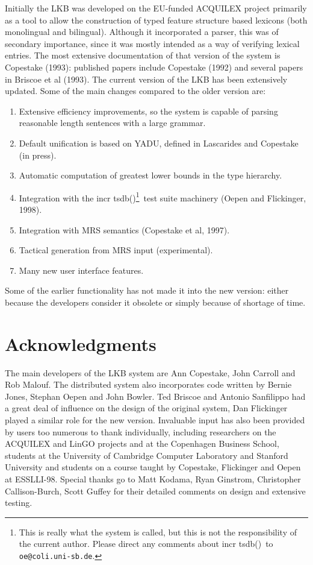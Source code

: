 \documentclass[12pt]{report}
\newcommand{\itsdb}{{\sf \lbrack incr tsdb()\rbrack}}
\begin{document}
Initially the LKB was developed on the 
EU-funded ACQUILEX project primarily as a
tool to allow the construction of typed feature structure based lexicons
(both monolingual and bilingual).  
Although it incorporated a parser,
this was of secondary importance, since it was mostly intended as
a way of verifying lexical entries.  The most extensive documentation
of that version of the system is Copestake (1993): published
papers include Copestake (1992) and several papers in Briscoe et al (1993).
The current version of the LKB has 
been extensively updated.  Some of the main changes compared to the older
version are:
\begin{enumerate}
\item Extensive efficiency improvements, so the system is capable
of parsing reasonable length sentences with a large grammar.
\item Default unification is based on YADU, defined in Lascarides and
Copestake (in press).
\item Automatic computation of greatest lower bounds in the type hierarchy.
\item Integration with the \itsdb\footnote{This is really
what the system is called, but this is not
the responsibility of the current author.  Please direct any comments
about \itsdb\ to {\tt oe@coli.uni-sb.de}.}\ test suite machinery 
(Oepen and Flickinger, 1998).
\item Integration with MRS semantics (Copestake et al, 1997).
\item Tactical generation from MRS input (experimental). 
\item Many new user interface features.
\end{enumerate}
Some of the earlier functionality has not made it into the new version:
either because the developers consider it obsolete or simply because of
shortage of time.  

\section{Acknowledgments}
\label{ack}

The main developers of the LKB system 
are Ann Copestake, John Carroll
and Rob Malouf.  The distributed system also incorporates code
written by Bernie Jones, Stephan Oepen and   
John Bowler.  Ted Briscoe and Antonio Sanfilippo had a great 
deal of influence on the design of the original system,
Dan Flickinger played a similar role for the new version.
Invaluable input has also
been provided by users too numerous to thank individually, including
researchers on the ACQUILEX and LinGO projects and at
the Copenhagen Business School,
students
at the University of Cambridge Computer Laboratory and
Stanford University and students on a course taught by Copestake, Flickinger
and Oepen at ESSLLI-98.  Special thanks go to
Matt Kodama, Ryan Ginstrom, Christopher Callison-Burch, Scott Guffey
for their detailed comments on design and extensive testing.
\end{document}
